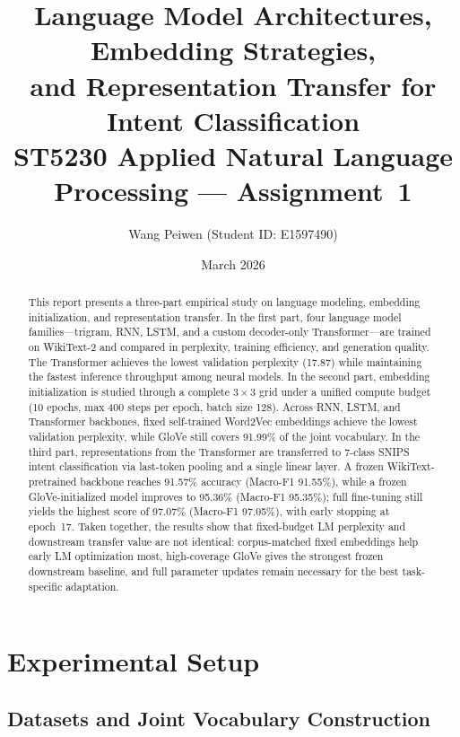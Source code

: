 \documentclass[10pt,a4paper]{article}
\title{%
    \textbf{Language Model Architectures, Embedding Strategies,\\
    and Representation Transfer for Intent Classification}\\[0.8ex]
    \large ST5230 Applied Natural Language Processing --- Assignment~1%
}
\author{Wang Peiwen \quad (Student ID: E1597490)}
\date{March 2026}
\begin{document}
\raggedbottom
\maketitle

\begin{abstract}
\noindent
This report presents a three-part empirical study on language modeling, embedding initialization, and representation transfer.
In the first part, four language model families---trigram, RNN, LSTM, and a custom decoder-only Transformer---are trained on WikiText-2 and compared in perplexity, training efficiency, and generation quality.
The Transformer achieves the lowest validation perplexity (17.87) while maintaining the fastest inference throughput among neural models.
In the second part, embedding initialization is studied through a complete $3 \times 3$ grid under a unified compute budget (10 epochs, max 400 steps per epoch, batch size 128). Across RNN, LSTM, and Transformer backbones, fixed self-trained Word2Vec embeddings achieve the lowest validation perplexity, while GloVe still covers 91.99\% of the joint vocabulary.
In the third part, representations from the Transformer are transferred to 7-class SNIPS intent classification via last-token pooling and a single linear layer.
A frozen WikiText-pretrained backbone reaches 91.57\% accuracy (Macro-F1 91.55\%), while a frozen GloVe-initialized model improves to 95.36\% (Macro-F1 95.35\%); full fine-tuning still yields the highest score of 97.07\% (Macro-F1 97.05\%), with early stopping at epoch~17.
Taken together, the results show that fixed-budget LM perplexity and downstream transfer value are not identical: corpus-matched fixed embeddings help early LM optimization most, high-coverage GloVe gives the strongest frozen downstream baseline, and full parameter updates remain necessary for the best task-specific adaptation.
\end{abstract}

\section{Experimental Setup}
\label{sec:setup}

\subsection{Datasets and Joint Vocabulary Construction}
\label{sec:data}
\end{document}
